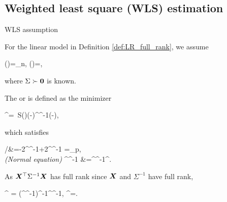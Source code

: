 \documentclass[10pt,a4paper]{book}
\begin{document}
\subsection{Weighted least square (WLS) estimation}\label{sec:LR_full_rank_WLS}
\begin{assbox}{WLS assumption}
	\begin{assumption}\label{ass:GM_ass_WLS}
		For the linear model in Definition \ref{def:LR_full_rank}, we assume 
		\begin{sequation}\label{eq:GM_ass_WLS}
			\bbE(\bave)=\0_n, \qquad \Cov(\bave)=\Sigma, 
		\end{sequation}
		where $\Sigma\succ{\boldsymbol 0}$ is known. 
	\end{assumption}
\end{assbox}
The  or  is defined as the minimizer 
\begin{salign*}
	\hat{\bab}^{\WLS}=\ S(\bab)\equiv (\Y-\X\bab)^\TT\Sigma^{-1}(\Y-\X\bab),
\end{salign*}
which satisfies 
\begin{salign*}
	 /{\partial\bab}&=-2\X^\TT\Sigma^{-1}\Y+2\X^\TT \Sigma^{-1} \X\bab=\0_p, \\ 
	\textit{({Normal equation})} \qquad \X^\TT\Sigma^{-1} \Y&=\X^\TT\Sigma^{-1}\X\hat{\bab}^{\WLS}.
\end{salign*}
As ${\boldsymbol X}^\top\Sigma^{-1}{\boldsymbol X}$ has full rank since ${\boldsymbol X}$ and $\Sigma^{-1}$ have full rank,
\begin{salign}\label{eq:LR_WLSE}
	\hat{\bab}^{\WLS} = (\X^\TT\Sigma^{-1}\X)^{-1}\X^\TT\Sigma^{-1}\Y, \qquad \bbE\hat{\bab}^{\WLS}=\bab.
\end{salign} 


\end{document}
